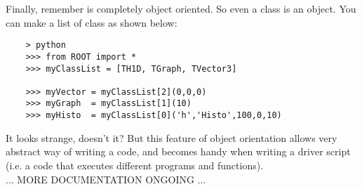 Finally, remember \python is completely object oriented. So even a {\ttfamily class} is an
object. You can make a list of {\ttfamily class} as shown below:
\begin{lstlisting}
    > python
    >>> from ROOT import *
    >>> myClassList = [TH1D, TGraph, TVector3]

    >>> myVector = myClassList[2](0,0,0)
    >>> myGraph  = myClassList[1](10)
    >>> myHisto  = myClassList[0]('h','Histo',100,0,10)
\end{lstlisting}
It looks strange, doesn't it? But this feature of object orientation allows very abstract
way of writing a code, and becomes handy when writing a driver script (i.e. a code that
executes different programs and functions).\\

... MORE DOCUMENTATION ONGOING ...


